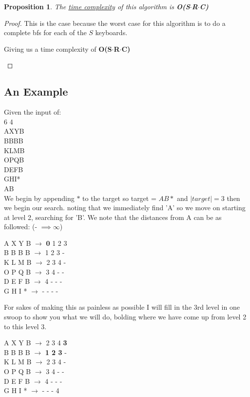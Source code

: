 \documentclass[12pt]{article}
\newtheorem{proposition}[theorem]{Proposition}
\begin{document}
\begin{proposition}
\label{numq}
The \underline{time complexity} of this algorithm is \textbf{O(S$\cdot$R$\cdot$C)}
\end{proposition}

\begin{proof}
This is the case because the worst case for this algorithm is to do a complete bfs for each of the $S$ keyboards.

\begin{center}
    Giving us a time complexity of \textbf{O(S$\cdot$R$\cdot$C)}
\end{center}
\end{proof}

\newpage
\subsection{An Example}
Given the input of: \\
6 4     \\
AXYB    \\
BBBB    \\
KLMB    \\
OPQB    \\
DEFB    \\
GHI*    \\
AB      \\

We begin by appending $\ast$ to the target so target = $AB\ast$ and $|target| = 3$ then we begin our search.
noting that we immediately find 'A' so we move on starting at level 2, searching for 'B'. We note that the
distances from A can be as followed: (- $\implies \infty$)
\begin{center}
A X Y B $\rightarrow$ \textbf{0} 1 2 3    \\
B B B B $\rightarrow$ 1 2 3 -    \\
K L M B $\rightarrow$ 2 3 4 -    \\
O P Q B $\rightarrow$ 3 4 - -    \\
D E F B $\rightarrow$ 4 - - -    \\
G H I * $\rightarrow$ - - - -
\end{center}

For sakes of making this as painless as possible I will fill in the 3rd level in one swoop to show you what
we will do, bolding where we have come up from level 2 to this level 3.
\begin{center}
A X Y B $\rightarrow$ 2 3 4 \textbf{3}    \\
B B B B $\rightarrow$ \textbf{1 2 3} -    \\
K L M B $\rightarrow$ 2 3 4 -    \\
O P Q B $\rightarrow$ 3 4 - -    \\
D E F B $\rightarrow$ 4 - - -    \\
G H I * $\rightarrow$ - - - 4
\end{center}
\end{document}

